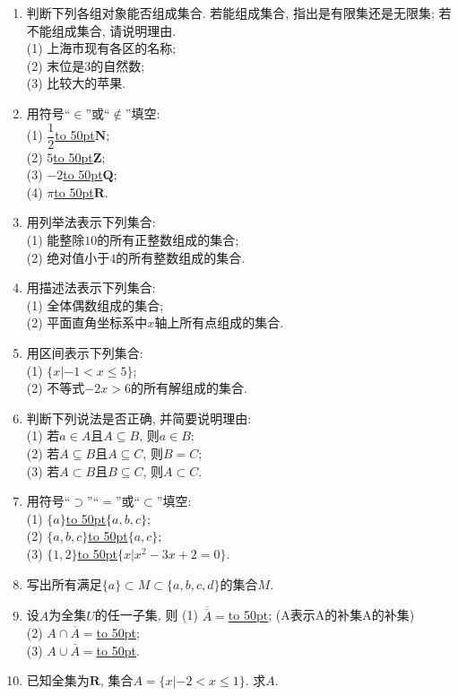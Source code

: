 \documentclass[10pt,a4paper]{article}
\newcommand{\blank}[1]{\underline{\hbox to #1pt{}}}
\begin{document}
\begin{enumerate}[1.]
\item 判断下列各组对象能否组成集合. 若能组成集合, 指出是有限集还是无限集; 若不能组成集合, 请说明理由.\\
(1) 上海市现有各区的名称;\\
(2) 末位是$3$的自然数;\\
(3) 比较大的苹果.
\item 用符号``$\in$''或``$\not\in$''填空:\\
(1) $\dfrac12$\blank{50}$\mathbf{N}$;\\
(2) $5$\blank{50}$\mathbf{Z}$;\\
(3) $-2$\blank{50}$\mathbf{Q}$;\\
(4) $\pi$\blank{50}$\mathbf{R}$. 
\item 用列举法表示下列集合:\\
(1) 能整除$10$的所有正整数组成的集合;\\
(2) 绝对值小于$4$的所有整数组成的集合.
\item 用描述法表示下列集合:\\
(1) 全体偶数组成的集合;\\
(2) 平面直角坐标系中$x$轴上所有点组成的集合.
\item 用区间表示下列集合:\\
(1) $\{x|-1<x\le 5\}$;\\
(2) 不等式$-2x>6$的所有解组成的集合. 
\item 判断下列说法是否正确, 并简要说明理由:\\
(1) 若$a\in A$且$A\subseteq B$, 则$a\in B$;\\
(2) 若$A\subseteq B$且$A\subseteq C$, 则$B=C$;\\
(3) 若$A\subset B$且$B\subseteq C$, 则$A\subset C$.
\item 用符号``$\supset$''``$=$''或``$\subset$''填空:\\
(1) $\{a\}$\blank{50}$\{a, b, c\}$;\\
(2) $\{a, b, c\}$\blank{50}$\{a, c\}$;\\
(3) $\{1, 2\}$\blank{50}$\{x|x^2-3x+2=0\}$.
\item 写出所有满足$\{a\}\subset M\subset \{a, b, c, d\}$的集合$M$.
\item 设$A$为全集$U$的任一子集, 则
(1) $\overline{\overline{A}}=$\blank{50}; (A表示A的补集A的补集)\\
(2) $A\cap \overline A=$\blank{50};\\
(3) $A\cup \overline A=$\blank{50}.
\item 已知全集为$\mathbf{R}$, 集合$A=\{x|-2<x\le 1\}$. 求$A$.

\end{enumerate}
\end{document}
